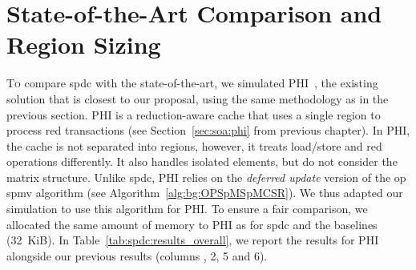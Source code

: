 \section{State-of-the-Art Comparison and Region Sizing}
\label{sec:spdc:soa_comp}

\lettrine{T}{o} compare \acrlong{spdc} with the state-of-the-art, we simulated PHI~\cite{Mukkara2019_PHI}, the existing solution that is closest to our proposal, using the same methodology as in the previous section.
PHI is a \gls{reduction}-aware cache that uses a single region to process \acrshort{red} transactions (see Section~\ref{sec:soa:phi} from previous chapter).
In PHI, the cache is not separated into regions, however, it treats load/store and \acrshort{red} operations differently.
It also handles isolated elements, but do not consider the matrix structure.
Unlike \acrlong{spdc}, PHI relies on the \emph{deferred update} version of the \acrshort{op} \acrshort{spmv} algorithm (see Algorithm~\ref{alg:bg:OPSpMSpMCSR}).
We thus adapted our simulation to use this algorithm for PHI.
To ensure a fair comparison, we allocated the same amount of memory to PHI as for \acrlong{spdc} and the baselines (32~KiB).
In Table~\ref{tab:spdc:results_overall}, we report the results for PHI alongside our previous results (columns , 2, 5 and 6).

